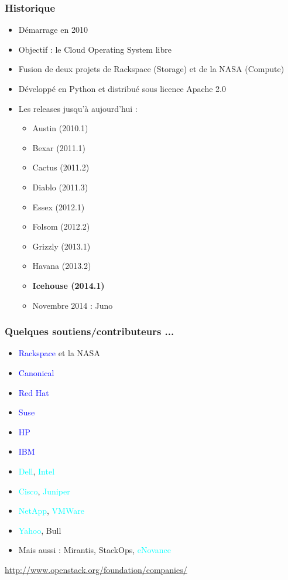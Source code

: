   \begin{frame}
    \frametitle{Historique}
    \begin{itemize}
      \item Démarrage en 2010
      \item Objectif : le Cloud Operating System libre
      \item Fusion de deux projets de Rackspace (Storage) et de la NASA (Compute)
      \item Développé en Python et distribué sous licence Apache 2.0\pause
      \item Les releases jusqu'à aujourd'hui :
      \begin{itemize}
        \item Austin (2010.1)
        \item Bexar (2011.1)
        \item Cactus (2011.2)
        \item Diablo (2011.3)
        \item Essex (2012.1)
        \item Folsom (2012.2)
        \item Grizzly (2013.1)
        \item Havana (2013.2)
        \item \textbf{Icehouse (2014.1)}\pause
        \item Novembre 2014 : Juno
      \end{itemize}
    \end{itemize}
  \end{frame}

  \begin{frame}
    \frametitle{Quelques soutiens/contributeurs ...}
    \begin{itemize}
      \item \textcolor{blue}{Rackspace} et la NASA\pause
      \item \textcolor{blue}{Canonical}
      \item \textcolor{blue}{Red Hat}
      \item \textcolor{blue}{Suse}\pause
      \item \textcolor{blue}{HP}
      \item \textcolor{blue}{IBM}
      \item \textcolor{cyan}{Dell}, \textcolor{cyan}{Intel}
      \item \textcolor{cyan}{Cisco}, \textcolor{cyan}{Juniper}\pause
      \item \textcolor{cyan}{NetApp}, \textcolor{cyan}{VMWare}\pause
      \item \textcolor{cyan}{Yahoo}, Bull\pause
      \item Mais aussi : Mirantis, StackOps, \textcolor{cyan}{eNovance}\pause
    \end{itemize}
    \url{http://www.openstack.org/foundation/companies/}
  \end{frame}

